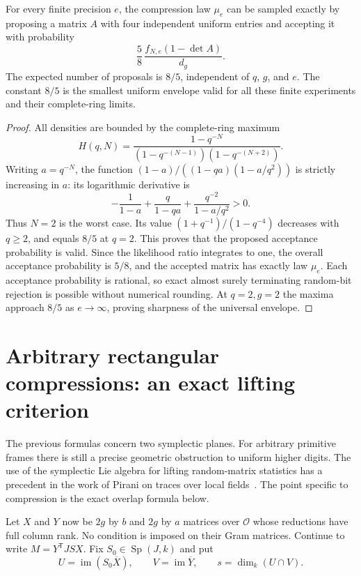 \begin{corollary}
\label{cor:padic-sampler}
For every finite precision $e$, the compression law $\mu_e$ can be
sampled exactly by proposing a matrix $A$ with four independent
uniform entries and accepting it with probability
\[
 \frac58\,\frac{f_{N,e}(1-\det A)}{d_g}.
\]
The expected number of proposals is $8/5$, independent of $q$, $g$,
and $e$. The constant $8/5$ is the smallest uniform envelope valid
for all these finite experiments and their complete-ring limits.
\end{corollary}

\begin{proof}
All densities are bounded by the complete-ring maximum
\[
 H(q,N)=\frac{1-q^{-N}}
 {(1-q^{-(N-1)})(1-q^{-(N+2)})}.
\]
Writing $a=q^{-N}$, the function
$(1-a)/((1-qa)(1-a/q^2))$ is strictly increasing in $a$: its logarithmic
derivative is
\[
 -\frac1{1-a}+\frac q{1-qa}+\frac{q^{-2}}{1-a/q^2}>0.
\]
Thus $N=2$ is the worst case. Its value
$(1+q^{-1})/(1-q^{-4})$ decreases with $q\geq2$, and equals $8/5$
at $q=2$. This proves that the proposed acceptance probability is
valid. Since the likelihood ratio integrates to one, the overall
acceptance probability is $5/8$, and the accepted matrix has exactly
law $\mu_e$. Each acceptance probability is rational, so exact
almost surely terminating random-bit rejection is possible without numerical rounding.
At $q=2,g=2$ the maxima approach $8/5$ as $e\to\infty$, proving
sharpness of the universal envelope.
\end{proof}

\section{Arbitrary rectangular compressions: an exact lifting criterion}
\label{sec:padic-rectangular}

The previous formulas concern two symplectic planes. For arbitrary
primitive frames there is still a precise geometric obstruction to
uniform higher digits. The use of the symplectic Lie algebra for
lifting random-matrix statistics has a precedent in the work of
Pirani on traces over local fields~\cite{Pirani2024}. The point specific to compression
is the exact overlap formula below.

Let $X$ and $Y$ now be $2g$ by $b$ and $2g$ by $a$ matrices over
$\mathcal O$ whose reductions have full column rank. No condition is
imposed on their Gram matrices. Continue to write
$M=Y^{\mathsf T}JSX$. Fix $S_0\in\operatorname{Sp}(J,k)$ and put
\[
 U=\operatorname{im}(S_0\overline X),\qquad
 V=\operatorname{im}\overline Y,\qquad s=\dim_k(U\cap V).
\]

